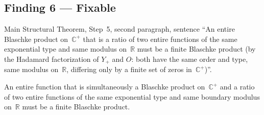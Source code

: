 \documentclass[11pt]{article}
\newcommand{\R}{\mathbb{R}}
\newcommand{\C}{\mathbb{C}}
\begin{document}
\subsection*{Finding 6 — Fixable}

\begin{description}[leftmargin=0pt]
\item[Location:]
Main Structural Theorem, Step~5, second paragraph, sentence
``An entire Blaschke product on~$\C^+$ that is a ratio of two entire functions
of the same exponential type and same modulus on~$\R$ must be a finite Blaschke
product (by the Hadamard factorization of $Y_+$ and $O$: both have the same order
and type, same modulus on~$\R$, differing only by a finite set of zeros in~$\C^+$)''.

\item[Claim as written:]
An entire function that is simultaneously a Blaschke product on~$\C^+$ and a ratio
of two entire functions of the same exponential type and same boundary modulus
on~$\R$ must be a finite Blaschke product.


\end{description}
\end{document}
